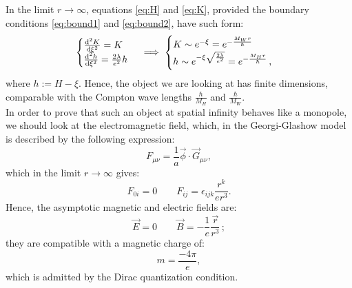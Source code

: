\documentclass[main.tex]{subfiles}
\begin{document}
In the limit $r \to \infty$, equations \eqref{eq:H} and \eqref{eq:K}, provided the boundary conditions \eqref{eq:bound1} and \eqref{eq:bound2}, have such form: 
\begin{equation}
\begin{cases}
\dv[2]{K}{\xi}    = K    \\
\dv[2]{h}{\xi}   =  \frac{2 \lambda}{e^2} h \\
\end{cases}
\implies
\begin{cases}
K \sim e^{-\xi} = e^{- \frac{M_W r}{\hbar}}\\
h \sim e^{-\xi \sqrt{\frac{2 \lambda}{e^2}}} = e^{- \frac{M_H r}{\hbar}} \,,
\end{cases}
\end{equation}
where $h:= H - \xi$.
Hence, the object we are looking at has finite dimensions, comparable with the Compton wave lengths $\frac{\hbar}{M_H}$ and $\frac{\hbar}{M_W}$. \\

In order to prove that such an object at spatial infinity behaves like a monopole, we should look at the electromagnetic field, which, in the Georgi-Glashow model is described by the following expression: 
\begin{equation}
 F_{\mu \nu} = \frac{1}{a} \vec{\phi} \cdot \vec{G}_{\mu \nu },
\end{equation}
which in the limit $r \to \infty$  gives:
\begin{equation}
F_{0i}= 0 \qquad F_{ij}= \epsilon_{ijk} \frac{r^k}{e r^3}.
\end{equation}
Hence, the asymptotic magnetic and electric fields are: 
\begin{equation}
\vec{E}=0 \qquad  \vec{B}= - \frac{1}{e} \frac{\vec{r}}{r^3}\,;
\end{equation}
they are compatible with a magnetic charge of: 
\begin{equation}
m= \frac{-4 \pi}{e},
\end{equation}
which is admitted by the Dirac quantization condition.

\end{document}
